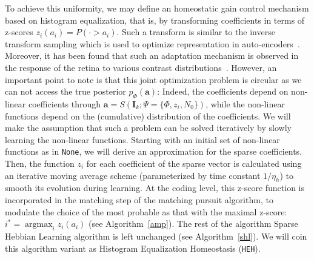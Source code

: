 \documentclass[draft]{article} %
\DeclareMathOperator*{\ArgMax}{\arg\max}   %
\newcommand{\coef}{\mathbf{a}} %
\newcommand{\image}{\mathbf{I}} %
\newcommand{\dico}{\Phi} %
\begin{document}

To achieve this uniformity, we may define an homeostatic gain control mechanism based on histogram equalization, that is, by transforming coefficients in terms of z-scores $z_i(a_i) = P( \cdot > a_i)$. Such a transform is similar to the inverse transform sampling which is used to optimize representation in auto-encoders~\citep{Doersch2016}.
Moreover, it has been found that such an adaptation mechanism is observed in the response of the retina to various contrast distributions~\citep{Laughlin81}. However, an important point to note is that this joint optimization problem is circular as we can not access the true posterior $p_\dico(\coef)$: Indeed, the coefficients depend on non-linear coefficients through $\coef = S(\image_k; \Psi=\{\dico, z_i, N_0\})$, while the non-linear functions depend on the (cumulative) distribution of the coefficients. We will make the assumption that such a problem can be solved iteratively by slowly learning the non-linear functions. Starting with an initial set of non-linear functions as in \texttt{None}, we will derive an approximation for the sparse coefficients. Then, the function $z_i$ for each coefficient of the sparse vector is calculated using an iterative moving average scheme (parameterized by time constant $1/\eta_h$) to smooth its evolution during learning. At the coding level, this z-score function is incorporated in the matching step of the matching pursuit algorithm, to modulate the choice of the most probable as that with the maximal z-score: $i^\ast = \ArgMax_i z_i(a_i)$ (see Algorithm~\ref{amp}). The rest of the algorithm Sparse Hebbian Learning algorithm is left unchanged (see Algorithm~\ref{shl}). We will coin this algorithm variant as Histogram Equalization Homeostasis (\texttt{HEH}).
\end{document}
